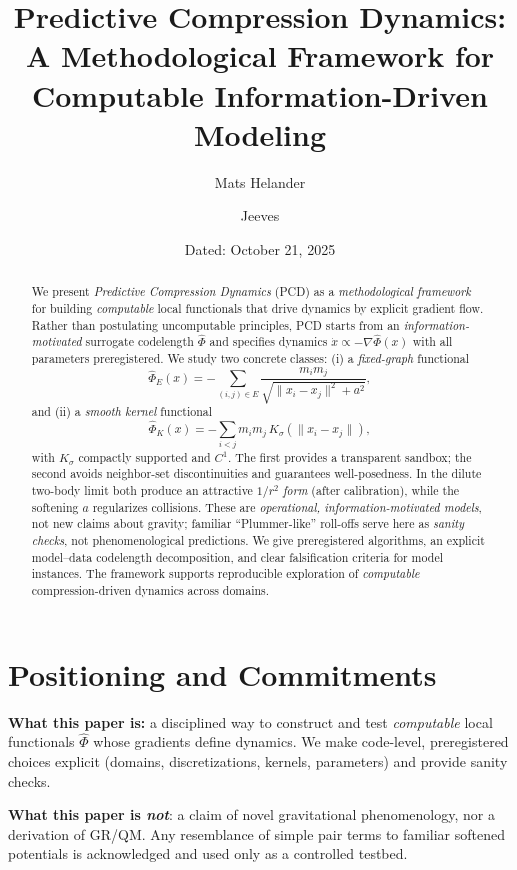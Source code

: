 \documentclass[11pt,a4paper]{article}
\title{\bf Predictive Compression Dynamics:\\
A Methodological Framework for Computable Information-Driven Modeling}
\author[1]{Mats Helander}
\author[1]{Jeeves}
\affil[1]{Independent Research}
\date{Dated: October 21, 2025}
\numberwithin{equation}{section}
\begin{document}
\maketitle

\begin{abstract}
\noindent
We present \emph{Predictive Compression Dynamics} (PCD) as a \emph{methodological framework} for building \emph{computable} local functionals that drive dynamics by explicit gradient flow. Rather than postulating uncomputable principles, PCD starts from an \emph{information-motivated} surrogate codelength $\widehat{\Phi}$ and specifies dynamics $\dot{x}\propto -\nabla\widehat{\Phi}(x)$ with all parameters preregistered. We study two concrete classes: (i) a \emph{fixed-graph} functional
\[
\widehat{\Phi}_E(x)= -\!\!\sum_{(i,j)\in E}\frac{m_im_j}{\sqrt{\lVert x_i-x_j\rVert^2+a^2}},
\]
and (ii) a \emph{smooth kernel} functional
\[
\widehat{\Phi}_K(x)= -\sum_{i<j} m_im_j\,K_\sigma(\lVert x_i-x_j\rVert),
\]
with $K_\sigma$ compactly supported and $C^1$. The first provides a transparent sandbox; the second avoids neighbor-set discontinuities and guarantees well-posedness. In the dilute two-body limit both produce an attractive $1/r^2$ \emph{form} (after calibration), while the softening $a$ regularizes collisions. These are \emph{operational, information-motivated models}, not new claims about gravity; familiar “Plummer-like” roll-offs serve here as \emph{sanity checks}, not phenomenological predictions. We give preregistered algorithms, an explicit model--data codelength decomposition, and clear falsification criteria for model instances. The framework supports reproducible exploration of \emph{computable} compression-driven dynamics across domains.
\end{abstract}

\section{Positioning and Commitments}
\textbf{What this paper is:} a disciplined way to construct and test \emph{computable} local functionals $\widehat{\Phi}$ whose gradients define dynamics. We make code-level, preregistered choices explicit (domains, discretizations, kernels, parameters) and provide sanity checks.

\medskip
\noindent\textbf{What this paper is \emph{not}}: a claim of novel gravitational phenomenology, nor a derivation of GR/QM. Any resemblance of simple pair terms to familiar softened potentials is acknowledged and used only as a controlled testbed.
\end{document}
